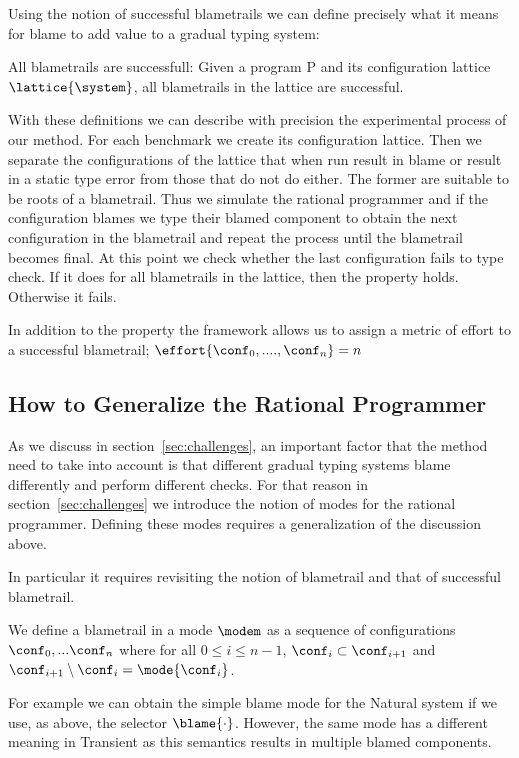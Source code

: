 Using the notion of successful blametrails we can define precisely what it
means for blame to add value to a gradual typing system: 

All blametrails are successfull: Given a program P and its configuration
lattice $\lattice{\system}$, all blametrails in the lattice are successful. 

With these definitions we can describe with precision the experimental
process of our method. For each benchmark we create its configuration
lattice. Then we separate the configurations of the lattice that 
when run result in blame or result in a static type error from  those that do not
do either. The former are 
suitable to be roots of a blametrail. Thus we simulate the rational 
programmer and if the configuration blames we type their blamed component to obtain the next
configuration in the blametrail and repeat the process until the
blametrail becomes final. At this point we check whether the last
configuration fails to type check. If it does for all blametrails in the
lattice, then the property holds. Otherwise it fails. 

In addition to the property the framework allows us to assign a metric of
effort to a successful blametrail; $\effort{\conf_0, ...., \conf_n} = n$ 

\subsection{How to Generalize the Rational Programmer} 

As we discuss in section~\ref{sec:challenges}, an important factor that the method need to
take into account is that different gradual typing systems blame
differently and perform different checks. For that reason in
section~\ref{sec:challenges} we introduce the notion of modes for the
rational programmer. Defining these modes requires a generalization of the 
discussion above. 

In particular it requires revisiting the notion of blametrail and that of
successful blametrail. 

We define a blametrail in a mode  $\modem$ as  
a sequence of configurations $\conf_0,...\conf_n$ where 
for all $0 \leq i \leq n - 1$, $\conf_i \subset \conf_{i+1}$ and
$\conf_{i+1} \setminus \conf_i = \mode{\conf_i}$.

   For example we can obtain the simple blame mode
for the Natural system if we use, as above, the selector $\blame{\cdot}$. 
However, the same mode has a different meaning in Transient as this
semantics results in multiple blamed components. 

